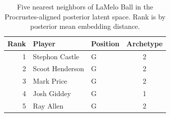 \begin{table}[htbp]
  \centering\small
  \begin{tabular}{rllc}
    \toprule
    Rank & Player & Position & Archetype \\
    \midrule
    1 & Stephon Castle & G & 2 \\
    2 & Scoot Henderson & G & 2 \\
    3 & Mark Price & G & 2 \\
    4 & Josh Giddey & G & 1 \\
    5 & Ray Allen & G & 2 \\
    \bottomrule
  \end{tabular}
  \caption{Five nearest neighbors of LaMelo Ball in the Procrustes-aligned posterior latent space. Rank is by posterior mean embedding distance.}
  \label{tab:LaMelo_Ball_neighbors}
\end{table}

